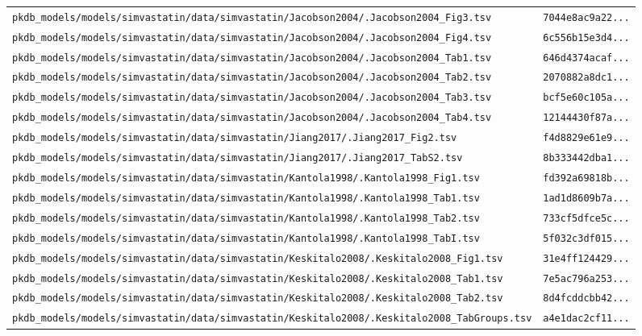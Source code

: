 \documentclass{article}
\begin{document}
\begin{longtable}{ll}
\texttt{pkdb\_models/models/simvastatin/data/simvastatin/Jacobson2004/.Jacobson2004\_Fig3.tsv} & \texttt{7044e8ac9a22...} \\
\texttt{pkdb\_models/models/simvastatin/data/simvastatin/Jacobson2004/.Jacobson2004\_Fig4.tsv} & \texttt{6c556b15e3d4...} \\
\texttt{pkdb\_models/models/simvastatin/data/simvastatin/Jacobson2004/.Jacobson2004\_Tab1.tsv} & \texttt{646d4374acaf...} \\
\texttt{pkdb\_models/models/simvastatin/data/simvastatin/Jacobson2004/.Jacobson2004\_Tab2.tsv} & \texttt{2070882a8dc1...} \\
\texttt{pkdb\_models/models/simvastatin/data/simvastatin/Jacobson2004/.Jacobson2004\_Tab3.tsv} & \texttt{bcf5e60c105a...} \\
\texttt{pkdb\_models/models/simvastatin/data/simvastatin/Jacobson2004/.Jacobson2004\_Tab4.tsv} & \texttt{12144430f87a...} \\
\texttt{pkdb\_models/models/simvastatin/data/simvastatin/Jiang2017/.Jiang2017\_Fig2.tsv} & \texttt{f4d8829e61e9...} \\
\texttt{pkdb\_models/models/simvastatin/data/simvastatin/Jiang2017/.Jiang2017\_TabS2.tsv} & \texttt{8b333442dba1...} \\
\texttt{pkdb\_models/models/simvastatin/data/simvastatin/Kantola1998/.Kantola1998\_Fig1.tsv} & \texttt{fd392a69818b...} \\
\texttt{pkdb\_models/models/simvastatin/data/simvastatin/Kantola1998/.Kantola1998\_Tab1.tsv} & \texttt{1ad1d8609b7a...} \\
\texttt{pkdb\_models/models/simvastatin/data/simvastatin/Kantola1998/.Kantola1998\_Tab2.tsv} & \texttt{733cf5dfce5c...} \\
\texttt{pkdb\_models/models/simvastatin/data/simvastatin/Kantola1998/.Kantola1998\_TabI.tsv} & \texttt{5f032c3df015...} \\
\texttt{pkdb\_models/models/simvastatin/data/simvastatin/Keskitalo2008/.Keskitalo2008\_Fig1.tsv} & \texttt{31e4ff124429...} \\
\texttt{pkdb\_models/models/simvastatin/data/simvastatin/Keskitalo2008/.Keskitalo2008\_Tab1.tsv} & \texttt{7e5ac796a253...} \\
\texttt{pkdb\_models/models/simvastatin/data/simvastatin/Keskitalo2008/.Keskitalo2008\_Tab2.tsv} & \texttt{8d4fcddcbb42...} \\
\texttt{pkdb\_models/models/simvastatin/data/simvastatin/Keskitalo2008/.Keskitalo2008\_TabGroups.tsv} & \texttt{a4e1dac2cf11...} \\

\end{longtable}
\end{document}
